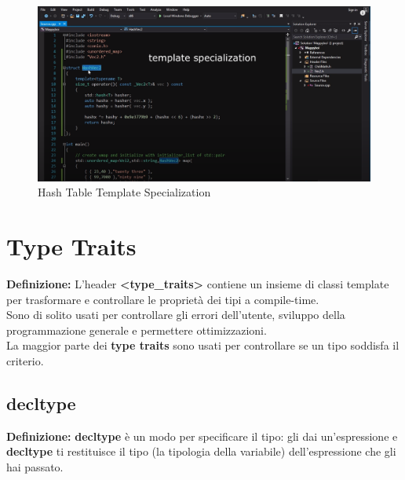 \begin{figure}[H]
	\centering
	\includegraphics[width=1\textwidth, height=1\textheight, keepaspectratio]{./imgs/hash_table_template_specialization.png}
	\caption{Hash Table Template Specialization}
	\label{fig:hash_table_template_specialization}
\end{figure}



\newpage

\section{Type Traits}

\textsf{\small \textbf{Definizione: } L'header \textbf{<type\_traits>} contiene un insieme di classi template per trasformare e controllare le proprietà dei tipi a compile-time.} \\

\textsf{\small Sono di solito usati per controllare gli errori dell'utente, sviluppo della programmazione generale e permettere ottimizzazioni.} \\

\textsf{\small La maggior parte dei \textbf{type traits} sono usati per controllare se un tipo soddisfa il criterio.} \\

\subsection{decltype}

\textsf{\small \textbf{Definizione: } \textbf{decltype} è un modo per specificare il  tipo: gli dai un'espressione e \textbf{decltype} ti restituisce il tipo (la tipologia della variabile) dell'espressione che gli hai passato.} \\

